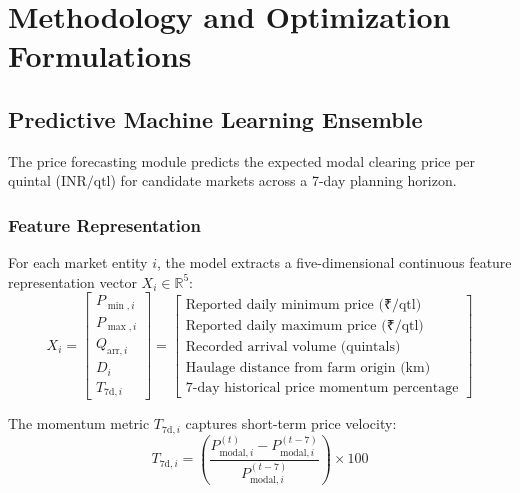 \documentclass[conference]{IEEEtran}
\begin{document}
\section{Methodology and Optimization Formulations}

\subsection{Predictive Machine Learning Ensemble}
The price forecasting module predicts the expected modal clearing price per quintal ($\text{INR}/\text{qtl}$) for candidate markets across a 7-day planning horizon.

\subsubsection{Feature Representation}
For each market entity $i$, the model extracts a five-dimensional continuous feature representation vector $X_i \in \mathbb{R}^5$:
\begin{equation}
X_i = \begin{bmatrix}
P_{\min, i} \\
P_{\max, i} \\
Q_{\text{arr}, i} \\
D_i \\
T_{\text{7d}, i}
\end{bmatrix} = \begin{bmatrix}
\text{Reported daily minimum price (₹/qtl)} \\
\text{Reported daily maximum price (₹/qtl)} \\
\text{Recorded arrival volume (quintals)} \\
\text{Haulage distance from farm origin (km)} \\
\text{7-day historical price momentum percentage}
\end{bmatrix}
\end{equation}

The momentum metric $T_{\text{7d}, i}$ captures short-term price velocity:
\begin{equation}
T_{\text{7d}, i} = \left( \frac{P_{\text{modal}, i}^{(t)} - P_{\text{modal}, i}^{(t-7)}}{P_{\text{modal}, i}^{(t-7)}} \right) \times 100
\end{equation}
\end{document}
